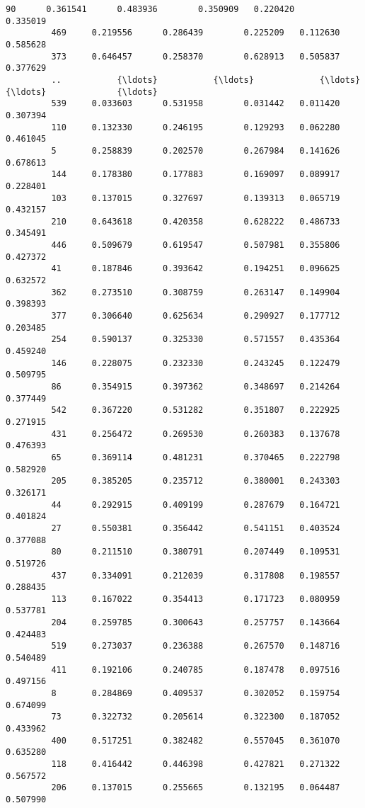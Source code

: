 \documentclass[11pt]{article}
\begin{document}
\begin{Verbatim}[commandchars=\\\{\}]
         90      0.361541      0.483936        0.350909   0.220420         0.335019   
         469     0.219556      0.286439        0.225209   0.112630         0.585628   
         373     0.646457      0.258370        0.628913   0.505837         0.377629   
         ..           {\ldots}           {\ldots}             {\ldots}        {\ldots}              {\ldots}   
         539     0.033603      0.531958        0.031442   0.011420         0.307394   
         110     0.132330      0.246195        0.129293   0.062280         0.461045   
         5       0.258839      0.202570        0.267984   0.141626         0.678613   
         144     0.178380      0.177883        0.169097   0.089917         0.228401   
         103     0.137015      0.327697        0.139313   0.065719         0.432157   
         210     0.643618      0.420358        0.628222   0.486733         0.345491   
         446     0.509679      0.619547        0.507981   0.355806         0.427372   
         41      0.187846      0.393642        0.194251   0.096625         0.632572   
         362     0.273510      0.308759        0.263147   0.149904         0.398393   
         377     0.306640      0.625634        0.290927   0.177712         0.203485   
         254     0.590137      0.325330        0.571557   0.435364         0.459240   
         146     0.228075      0.232330        0.243245   0.122479         0.509795   
         86      0.354915      0.397362        0.348697   0.214264         0.377449   
         542     0.367220      0.531282        0.351807   0.222925         0.271915   
         431     0.256472      0.269530        0.260383   0.137678         0.476393   
         65      0.369114      0.481231        0.370465   0.222798         0.582920   
         205     0.385205      0.235712        0.380001   0.243303         0.326171   
         44      0.292915      0.409199        0.287679   0.164721         0.401824   
         27      0.550381      0.356442        0.541151   0.403524         0.377088   
         80      0.211510      0.380791        0.207449   0.109531         0.519726   
         437     0.334091      0.212039        0.317808   0.198557         0.288435   
         113     0.167022      0.354413        0.171723   0.080959         0.537781   
         204     0.259785      0.300643        0.257757   0.143664         0.424483   
         519     0.273037      0.236388        0.267570   0.148716         0.540489   
         411     0.192106      0.240785        0.187478   0.097516         0.497156   
         8       0.284869      0.409537        0.302052   0.159754         0.674099   
         73      0.322732      0.205614        0.322300   0.187052         0.433962   
         400     0.517251      0.382482        0.557045   0.361070         0.635280   
         118     0.416442      0.446398        0.427821   0.271322         0.567572   
         206     0.137015      0.255665        0.132195   0.064487         0.507990   
         

\end{Verbatim}
\end{document}
